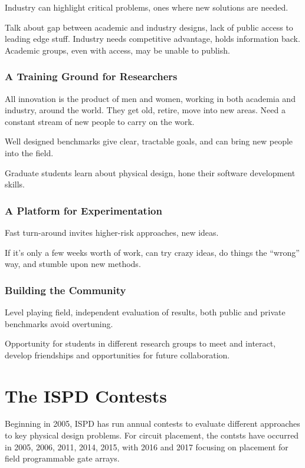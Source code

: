 \documentclass[sigconf]{acmart}
\begin{document}
Industry can highlight critical problems, ones where new solutions
are needed.

Talk about gap between academic and industry designs, lack of
public access to leading edge stuff.  Industry needs competitive
advantage, holds information back.  Academic groups, even
with access, may be unable to publish.


\subsubsection{A Training Ground for Researchers}

All innovation is the product of men and women, working in both
academia and industry, around the world.  They get old, retire,
move into new areas.  Need a constant stream of new people to
carry on the work.

Well designed benchmarks give clear, tractable goals, and can
bring new people into the field.

Graduate students learn about physical design, hone their software
development skills.


\subsubsection{A Platform for Experimentation}

Fast turn-around invites higher-risk approaches, new ideas.

If it's only a few weeks worth of work, can try crazy
ideas, do things the ``wrong'' way, and stumble upon new
methods.

\subsubsection{Building the Community}

Level playing field, independent evaluation of results,
both public and private benchmarks avoid overtuning.

Opportunity for students in different research groups
to meet and interact, develop friendships and opportunities
for future collaboration.



\section{The ISPD Contests}

Beginning in 2005, ISPD has run annual contests to evaluate
different approaches to key physical design problems.  For circuit
placement, the contsts have occurred in 2005, 2006, 2011, 2014,
2015, with 2016 and 2017 focusing on placement for
field programmable gate arrays.
\end{document}
